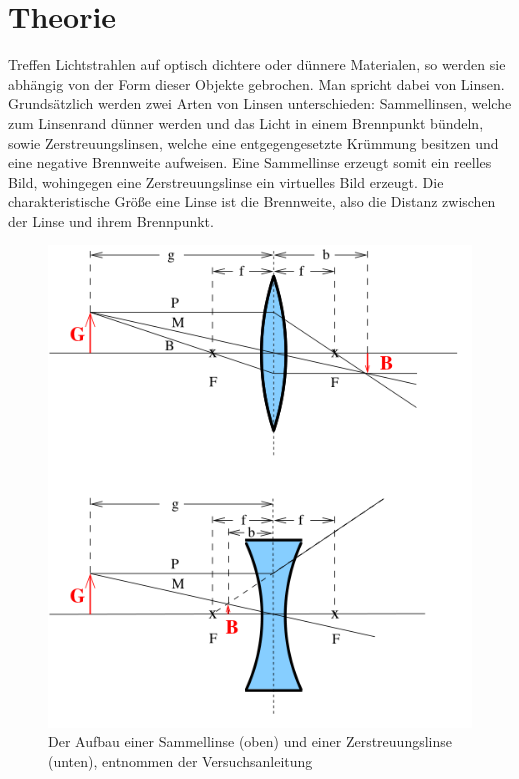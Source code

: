 \section{Theorie}
\label{sec:Theorie}

Treffen Lichtstrahlen auf optisch dichtere oder dünnere Materialen, so werden sie abhängig von der Form  dieser Objekte gebrochen.
Man spricht dabei von Linsen.
Grundsätzlich werden zwei Arten von Linsen unterschieden: Sammellinsen, welche zum Linsenrand dünner werden und das Licht in einem Brennpunkt bündeln, sowie Zerstreuungslinsen, welche eine entgegengesetzte Krümmung besitzen und eine negative Brennweite aufweisen.
Eine Sammellinse erzeugt somit ein reelles Bild, wohingegen eine Zerstreuungslinse ein virtuelles Bild erzeugt.
Die charakteristische Größe eine Linse ist die Brennweite, also die Distanz zwischen der Linse und ihrem Brennpunkt.

\begin{figure}
  \centering
  \includegraphics[scale=0.4]{images/Linsen.png}
  \caption{Der Aufbau einer Sammellinse (oben) und einer Zerstreuungslinse (unten), entnommen der Versuchsanleitung \cite[1]{sample}}
  \label{fig:Linsen}
\end{figure}

